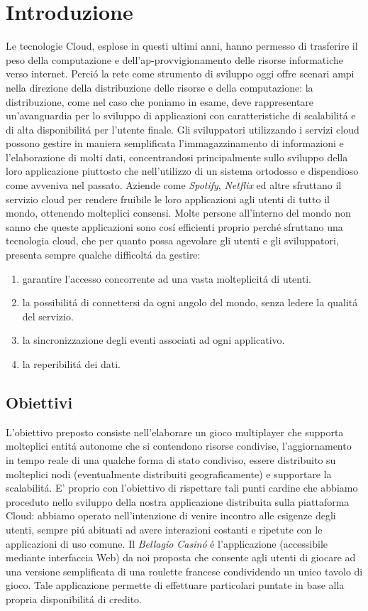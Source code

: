 \documentclass{sig-alternate-05-2015}
\begin{document}
\section{Introduzione}


Le tecnologie Cloud, esplose in questi ultimi anni, hanno permesso di trasferire il peso della computazione e dell'ap-provvigionamento delle risorse informatiche verso internet. Perci\'o la rete come strumento di sviluppo oggi offre scenari ampi nella direzione della distribuzione delle risorse e della computazione: la distribuzione, come nel caso che poniamo in esame, deve rappresentare un'avanguardia per lo sviluppo di applicazioni con caratteristiche di scalabilit\'a e di alta disponibilit\'a per l'utente finale. 
Gli sviluppatori utilizzando i servizi cloud possono gestire in maniera semplificata l'immagazzinamento di informazioni e l'elaborazione di molti dati, concentrandosi principalmente sullo sviluppo della loro applicazione piuttosto che nell'utilizzo di un sistema ortodosso e dispendioso come avveniva nel passato.
Aziende come \textit{Spotify}, \textit{Netflix} ed altre sfruttano il servizio cloud per rendere fruibile le loro applicazioni agli utenti di tutto il mondo, ottenendo molteplici consensi.
Molte persone all'interno del mondo non sanno che queste applicazioni sono cos\'i efficienti proprio perch\'e sfruttano una tecnologia cloud, che per quanto possa agevolare gli utenti e gli sviluppatori, presenta sempre qualche difficolt\'a da gestire:
\begin{enumerate}
\item garantire l'accesso concorrente ad una vasta molteplicit\'a di utenti.
\item la possibilit\'a di connettersi da ogni angolo del mondo, senza ledere la qualit\'a del servizio.
\item la sincronizzazione degli eventi associati ad ogni applicativo.
\item la reperibilit\'a dei dati.
\end{enumerate}

\subsection{Obiettivi}


L'obiettivo preposto consiste nell'elaborare un gioco multiplayer che supporta molteplici entit\'a autonome che si contendono risorse condivise, l'aggiornamento in tempo reale di una qualche forma di stato condiviso, essere distribuito su molteplici nodi (eventualmente distribuiti geograficamente) e supportare la scalabilit\'a.
E' proprio con l'obiettivo di rispettare tali punti cardine che abbiamo proceduto nello sviluppo della nostra applicazione distribuita sulla piattaforma Cloud: abbiamo operato nell'intenzione di venire incontro alle esigenze degli utenti, sempre pi\'u abituati ad avere interazioni costanti e ripetute con le applicazioni di uso comune.
Il \textit{Bellagio Casin\'o} \'e l'applicazione (accessibile mediante interfaccia Web) da noi proposta che consente agli utenti di giocare ad una versione semplificata di una roulette francese condividendo un unico tavolo di gioco.
Tale applicazione permette di effettuare particolari puntate in base alla propria disponibilit\'a di credito.
\end{document}
